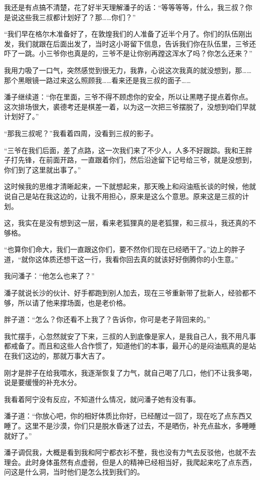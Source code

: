 我还是有点搞不清楚，花了好半天理解潘子的话：“等等等等，什么，我三叔？你是说这些我三叔都计划好了？那……你们？”

“我们早在格尔木准备好了，在敦煌我们的人准备了近半个月了。你们的队伍刚出发，我们就跟在后面出发了，当时这小哥留下信息，告诉我们你在队伍里，三爷还吓了一跳。小三爷你也真是的，三爷不是让你别再蹚这浑水了吗？你怎么还来？”

我用力吸了一口气，突然感觉到很无力，我靠，心说这次我真的就没想到，那……那个黑眼镜一路过来这么照顾我……看来还是我三叔的面子……

潘子继续道：“你在里面，三爷不得不顾虑你的安全，所以让黑瞎子提点着你点。这次排场很大，裘德考还是棋差一着，以为这一次把三爷摆脱了，没想到咱们早就计划好了。”

“那我三叔呢？”我看着四周，没看到三叔的影子。

“三爷在我们后面，差了点路，这一次我们来了不少人，人多不好跟踪。我和王胖子打先锋，在前面开路，一直跟着你们，然后沿途留下记号给三爷，就是没想到，你们到了这里就出事了。”

这时候我的思维才清晰起来，一下就想起来，那天晚上和闷油瓶长谈的时候，他就说自己是站在我这边的，让我不用担心，原来是这么个意思。原来这是三叔的计划。

这，我实在是没有想到这一层，看来老狐狸真的是老狐狸，和三叔斗，我还真的不够格。

“也算你们命大，我们一直跟这你们，要不然你们现在已经晒干了。”边上的胖子道，“就你这体质还想干这一行，我看你回去真的就该好好倒腾你的小生意。”

我问潘子：“他怎么也来了？”

潘子就说长沙的伙计、好手都跑到别人加去，现在三爷重新带了批新人，经验都不够，所以请了他来撑场面，也是老价格。

胖子道：“怎么？你还看不上我了？告诉你，你可是老子背回来的。”

我忙摆手，心忽然就安了下来，三叔的人到底像是家人，是我自己人，我不用凡事都戒备了。而且和这些人合作惯了，知道他们的本事，最开心的是闷油瓶真的是站在我们这边的，那就万事大吉了。

刚才是胖子在给我喂水，我逐渐恢复了力气，就自己喝了几口，他们不让我多喝，说是要缓慢的补充水分。

我看着阿宁没有反应，不知道什么情况，就问潘子她有没有事。

潘子道：“你放心吧，你的相好体质比你好，已经醒过一回了，现在吃了点东西又睡了。这里不是沙漠，你们只是脱水昏迷了过去，不是晒伤，补充点盐水，多睡睡就好了。”

潘子调侃我，大概是看到我和阿宁都衣衫不整，我也没有力气去反驳他，也就不去理会。此时身体虽然有点虚弱，但是人的精神已经相当好，我爬起来吃了点东西，问这是什么洞，当时他们是怎么找到我们的。

